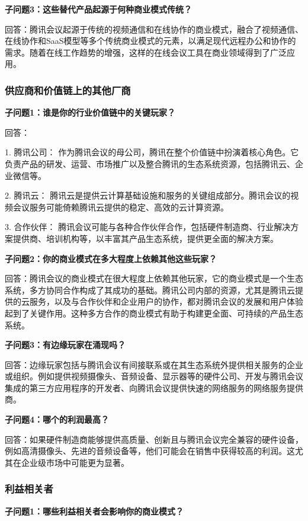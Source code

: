 \documentclass[a4paper,12pt]{article}
\begin{document}
    \textbf{子问题3：这些替代产品起源于何种商业模式传统？}

    回答：腾讯会议起源于传统的视频通信和在线协作的商业模式，融合了视频通信、在线协作和SaaS模型等多个传统商业模式的元素，以满足现代远程办公和协作的需求。随着在线工作趋势的增强，这样的在线会议工具在商业领域得到了广泛应用。
    
    \subsubsection{供应商和价值链上的其他厂商}
    \textbf{子问题1：谁是你的行业价值链中的关键玩家？}

    回答：
    
    1. 腾讯公司： 作为腾讯会议的母公司，腾讯在整个价值链中扮演着核心角色。它负责产品的研发、运营、市场推广以及整合腾讯的生态系统资源，包括腾讯云、企业微信等。
    
    2. 腾讯云： 腾讯云是提供云计算基础设施和服务的关键组成部分。腾讯会议的视频会议服务可能倚赖腾讯云提供的稳定、高效的云计算资源。

    3. 合作伙伴： 腾讯会议可能与各种合作伙伴合作，包括硬件制造商、行业解决方案提供商、培训机构等，以丰富其产品生态系统，提供更全面的解决方案。

    \textbf{子问题2：你的商业模式在多大程度上依赖其他这些玩家？}

    回答：腾讯会议的商业模式在很大程度上依赖其他玩家，它的商业模式是一个生态系统，多方协同合作构成了其成功的基础。腾讯公司内部的资源，尤其是腾讯云提供的云服务，以及与合作伙伴和企业用户的协作，都对腾讯会议的发展和用户体验起到了关键作用。这种多方合作的商业模式有助于构建更全面、可持续的产品生态系统。

    \textbf{子问题3：有边缘玩家在涌现吗？}

    回答：边缘玩家包括与腾讯会议有间接联系或在其生态系统外提供相关服务的企业或组织。例如提供视频摄像头、音频设备、显示器等的硬件公司、开发与腾讯会议集成的第三方应用程序的开发者、向腾讯会议提供快速的网络服务的网络服务提供商。

    \textbf{子问题4：哪个的利润最高？}

    回答：如果硬件制造商能够提供高质量、创新且与腾讯会议完全兼容的硬件设备，例如高清摄像头、先进的音频设备等，他们可能会在销售中获得较高的利润。这尤其在企业级市场中可能更为显著。
    
    \subsubsection{利益相关者}
    \textbf{子问题1：哪些利益相关者会影响你的商业模式？}
    
\end{document}
